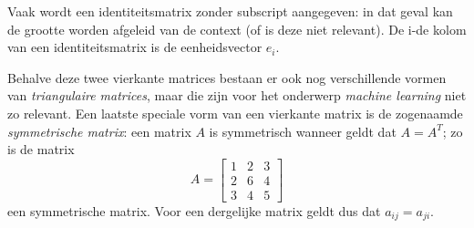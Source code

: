 Vaak wordt een identiteitsmatrix zonder subscript aangegeven: in dat geval kan de grootte worden afgeleid van de context (of is deze niet relevant). De i-de kolom van een identiteitsmatrix is de eenheidsvector $e_i$.

Behalve deze twee vierkante matrices bestaan er ook nog verschillende vormen van \textit{triangulaire matrices}, maar die zijn voor het onderwerp \textit{machine learning} niet zo relevant. Een laatste speciale vorm van een vierkante matrix is de zogenaamde \textit{symmetrische matrix}: een matrix $A$ is symmetrisch wanneer geldt dat $A = A^T$; zo is de matrix 
%
\[
A = 
\begin{bmatrix}
1 & 2 & 3 \\
2 & 6 & 4 \\
3 & 4 & 5
\end{bmatrix}
\]
%
een symmetrische matrix. Voor een dergelijke matrix geldt dus dat $a_{ij}=a_{ji}$.

